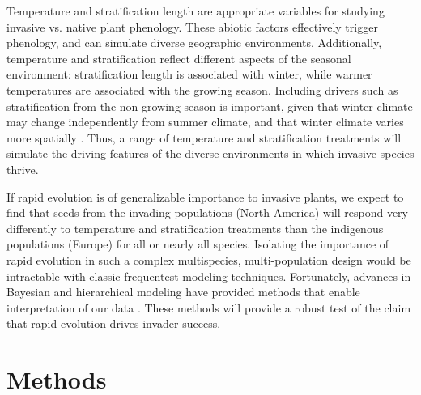 \documentclass[12pt]{article}\usepackage[]{graphicx}\usepackage[]{color}
\begin{document}
	Temperature and stratification length are appropriate variables for studying invasive vs. native plant phenology. These abiotic factors effectively trigger phenology, and can simulate diverse geographic environments. Additionally, temperature and stratification reflect different aspects of the seasonal environment: stratification length is associated with winter, while warmer temperatures are associated with the growing season. Including drivers such as stratification from the non-growing season is important, given that winter climate may change independently from summer climate, and that winter climate varies more spatially \parencite{Bonan2003}. Thus, a range of temperature and stratification treatments will simulate the driving features of the diverse environments in which invasive species thrive. 
	
	 If rapid evolution is of generalizable importance to invasive plants, we expect to find that seeds from the invading populations (North America) will respond very differently to temperature and stratification treatments than the indigenous populations (Europe) for all or nearly all species. Isolating the importance of rapid evolution in such a complex multispecies, multi-population design would be intractable with classic frequentest modeling  techniques. Fortunately, advances in Bayesian and hierarchical modeling have provided methods that enable interpretation of our data \parencite{Carpenter2017}.  These methods will provide a robust test of the claim that rapid evolution drives invader success.
	 
	\section{Methods}
\end{document}
